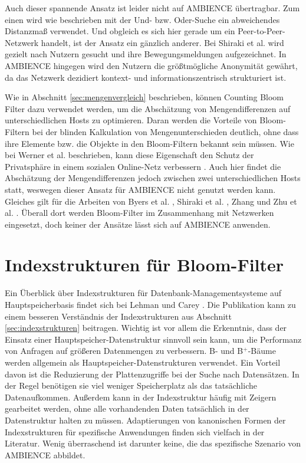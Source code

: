 Auch dieser spannende Ansatz ist leider nicht auf AMBIENCE übertragbar. Zum einen wird wie beschrieben mit der Und- bzw. Oder-Suche ein abweichendes Distanzmaß verwendet. Und obgleich es sich hier gerade um ein Peer-to-Peer-Netzwerk handelt, ist der Ansatz ein gänzlich anderer. Bei Shiraki et al. wird gezielt nach Nutzern gesucht und ihre Bewegungsmeldungen aufgezeichnet. In AMBIENCE hingegen wird den Nutzern die größtmögliche Anonymität gewährt, da das Netzwerk dezidiert kontext- und informationszentrisch strukturiert ist. 

Wie in Abschnitt \ref{sec:mengenvergleich} beschrieben, können Counting Bloom Filter dazu verwendet werden, um die Abschätzung von Mengendifferenzen auf unterschiedlichen Hosts zu optimieren. Daran werden die Vorteile von Bloom-Filtern bei der blinden Kalkulation von Mengenunterschieden deutlich, ohne dass ihre Elemente bzw. die Objekte in den Bloom-Filtern bekannt sein müssen. Wie bei Werner et al. beschrieben, kann diese Eigenschaft den Schutz der Privatsphäre in einem sozialen Online-Netz verbessern \cite{Werner2015}. Auch hier findet die Abschätzung der Mengendifferenzen jedoch zwischen zwei unterschiedlichen Hosts statt, weswegen dieser Ansatz für AMBIENCE nicht genutzt werden kann. Gleiches gilt für die Arbeiten von Byers et al. \cite{Byers2002}, Shiraki et al. \cite{Shiraki2009}, Zhang \cite{Zhang2012} und Zhu et al. \cite{Zhu2004}. Überall dort werden Bloom-Filter im Zusammenhang mit Netzwerken eingesetzt, doch keiner der Ansätze lässt sich auf AMBIENCE anwenden. 
\section{Indexstrukturen für Bloom-Filter}\label{sec:bloom-index}
Ein Überblick über Indexstrukturen für Datenbank-Managementsysteme auf Hauptspei\-cher\-basis findet sich bei Lehman und Carey \cite{Lehman1986}. Die Publikation kann zu einem besseren Verständnis der Indexstrukturen aus Abschnitt \ref{sec:indexstrukturen} beitragen. Wichtig ist vor allem die Erkenntnis, dass der Einsatz einer Hauptspeicher-Datenstruktur sinnvoll sein kann, um die Performanz von Anfragen auf größeren Datenmengen zu verbessern. B- und B$^+$-Bäume werden allgemein als Hauptspeicher-Datenstruk\-turen verwendet. Ein Vorteil davon ist die Reduzierung der Plattenzugriffe bei der Suche nach Datensätzen. In der Regel benötigen sie viel weniger Speicherplatz als das tatsächliche Datenaufkommen. Außerdem kann in der Indexstruktur häufig mit Zeigern gearbeitet werden, ohne alle vorhandenden Daten tatsächlich in der Datenstruktur halten zu müssen. Adaptierungen von kanonischen Formen der Indexstrukturen für spezifische Anwendungen finden sich vielfach in der Literatur. Wenig überraschend ist darunter keine, die das spezifische Szenario von AMBIENCE abbildet.

